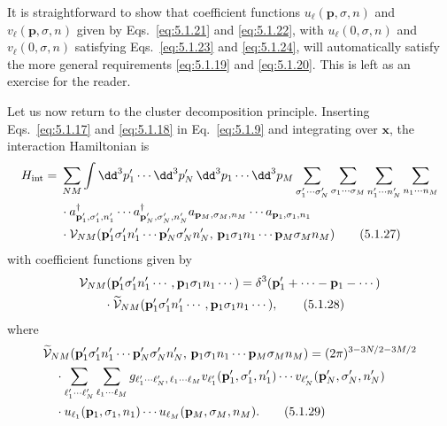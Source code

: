 It is straightforward to show that coefficient functions
$u_\ell(\mathbf{p},\sigma,n)$ and $v_\ell(\mathbf{p},\sigma,n)$ given by
Eqs.~\eqref{eq:5.1.21} and \eqref{eq:5.1.22}, with $u_\ell(0,\sigma,n)$ and
$v_\ell(0,\sigma,n)$ satisfying Eqs.~\eqref{eq:5.1.23} and \eqref{eq:5.1.24}, will automatically
satisfy the more general requirements \eqref{eq:5.1.19} and \eqref{eq:5.1.20}. This is left as
an exercise for the reader.

Let us now return to the cluster decomposition principle. Inserting
Eqs.~\eqref{eq:5.1.17} and \eqref{eq:5.1.18} in Eq.~\eqref{eq:5.1.9} and integrating over $\mathbf{x}$,
the interaction Hamiltonian is
\begin{align}
  H_{\mathrm{int}}={}&\sum_{NM}\int \dd^3p'_1\cdots \dd^3p'_N\,
  \dd^3p_1\cdots \dd^3p_M
  \sum_{\sigma'_1\cdots\sigma'_N}\sum_{\sigma_1\cdots\sigma_M}
  \sum_{n'_1\cdots n'_N}\sum_{n_1\cdots n_M}
  \notag\\
  &\cdot a^\dagger_{\mathbf{p}'_1,\sigma'_1,n'_1}\cdots
  a^\dagger_{\mathbf{p}'_N,\sigma'_N,n'_N}
  a_{\mathbf{p}_M,\sigma_M,n_M}\cdots a_{\mathbf{p}_1,\sigma_1,n_1}
  \notag\\
  &\cdot\mathcal{V}_{NM}(\mathbf{p}'_1\sigma'_1n'_1\cdots
  \mathbf{p}'_N\sigma'_Nn'_N,\,\mathbf{p}_1\sigma_1n_1\cdots
  \mathbf{p}_M\sigma_Mn_M)
  \tag{5.1.27}\label{eq:5.1.27}
\end{align}
with coefficient functions given by
\begin{align}
  &\mathcal{V}_{NM}(\mathbf{p}'_1\sigma'_1n'_1\cdots,
  \mathbf{p}_1\sigma_1n_1\cdots)
  =\delta^3(\mathbf{p}'_1+\cdots-\mathbf{p}_1-\cdots)
  \notag\\
  &\qquad\cdot\widetilde{\mathcal{V}}_{NM}
  (\mathbf{p}'_1\sigma'_1n'_1\cdots,\mathbf{p}_1\sigma_1n_1\cdots),
  \tag{5.1.28}\label{eq:5.1.28}
\end{align}
where
\begin{align}
  &\widetilde{\mathcal{V}}_{NM}(\mathbf{p}'_1\sigma'_1n'_1\cdots
  \mathbf{p}'_N\sigma'_Nn'_N,\,\mathbf{p}_1\sigma_1n_1\cdots
  \mathbf{p}_M\sigma_Mn_M)
  =(2\pi)^{3-3N/2-3M/2}
  \notag\\
  &\quad\cdot\sum_{\ell'_1\cdots\ell'_N}
  \sum_{\ell_1\cdots\ell_M}
  g_{\ell'_1\cdots\ell'_N,\,\ell_1\cdots\ell_M}
  v_{\ell'_1}(\mathbf{p}'_1,\sigma'_1,n'_1)\cdots
  v_{\ell'_N}(\mathbf{p}'_N,\sigma'_N,n'_N)
  \notag\\
  &\quad\cdot u_{\ell_1}(\mathbf{p}_1,\sigma_1,n_1)\cdots
  u_{\ell_M}(\mathbf{p}_M,\sigma_M,n_M).
  \tag{5.1.29}\label{eq:5.1.29}
\end{align}
